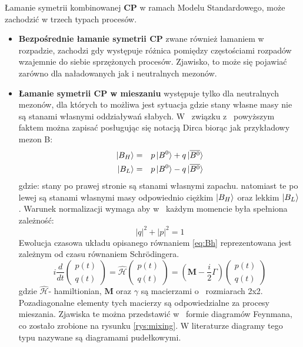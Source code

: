 Łamanie symetrii kombinowanej \textbf{CP} w ramach Modelu Standardowego, może zachodzić w trzech typach procesów.
\begin{itemize}
\item \textbf{Bezpośrednie łamanie symetrii \textbf{CP}} zwane również łamaniem w rozpadzie, zachodzi gdy występuje różnica pomiędzy częstościami rozpadów wzajemnie do siebie sprzężonych procesów. Zjawisko, to może się pojawiać zarówno dla naładowanych jak i neutralnych mezonów.
\item \textbf{Łamanie symetrii \textbf{CP} w mieszaniu} występuje tylko dla neutralnych mezonów, dla których to możliwa jest sytuacja gdzie stany własne masy nie są stanami własnymi oddziaływań słabych. W~ związku z~ powyższym faktem można zapisać posługując się notacją Dirca biorąc jak przykładowy mezon B:
\begin{eqnarray}
\ket{B_H}&=&p\ket{B^0}+q\ket{\overline{B^0}} \\ \nonumber
\ket{B_L}&=&p\ket{B^0}-q\ket{\overline{B^0}} 
\label{eq:Bh}
\end{eqnarray}
gdzie: stany po prawej stronie są stanami własnymi zapachu. natomiast te po lewej są stanami własnymi masy odpowiednio ciężkim $\ket{B_H}$ oraz lekkim $\ket{B_L}$. Warunek normalizacji wymaga aby w~ każdym momencie była spełniona zależność:
\begin{equation}
|q|^2+|p|^2=1
\label{eq:normalizacja}
\end{equation}
Ewolucja czasowa układu opisanego równaniem \ref{eq:Bh} reprezentowana jest zależnym od czasu równaniem Schrödingera. 
\begin{equation}
i\frac{d}{dt} \begin{pmatrix} p(t) \\ q(t)
\end{pmatrix}=\hat{\mathcal{H}} \begin{pmatrix} p(t) \\ q(t)
\end{pmatrix}=(\textbf{M}-\frac{i}{2}\Gamma) \begin{pmatrix} p(t) \\ q(t)
\end{pmatrix}
\label{Erwin}
\end{equation}
gdzie $\hat{\mathcal{H}}$- hamiltionian, $\textbf{M}$ oraz $\gamma$ są macierzami o~ rozmiarach 2x2. Pozadiagonalne elementy tych macierzy są odpowiedzialne za procesy mieszania. Zjawiska te można przedstawić w~ formie diagramów Feynmana, co zostało zrobione na rysunku \ref{rys:mixing}. W literaturze diagramy tego typu nazywane są diagramami pudełkowymi. 


\end{itemize}
